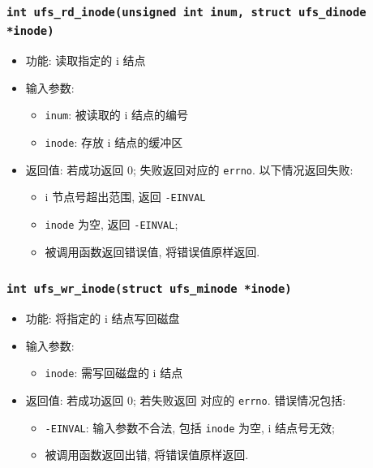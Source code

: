 \documentclass[nofonts]{ctexart}
\begin{document}
\subsubsection[\texttt{ufs\_free\_inode}]{\texttt{int ufs\_rd\_inode(unsigned int inum, struct ufs\_dinode *inode)}}
\begin{itemize}
\item
  功能: 读取指定的 i 结点
\item
  输入参数:

  \begin{itemize}
  \item
    \texttt{inum}: 被读取的 i 结点的编号
  \item
    \texttt{inode}: 存放 i 结点的缓冲区
  \end{itemize}
\item
  返回值: 若成功返回 0; 失败返回对应的 \texttt{errno}. 以下情况返回失败:

  \begin{itemize}
  \item
    i 节点号超出范围, 返回 \texttt{-EINVAL}
  \item
    \texttt{inode} 为空, 返回 \texttt{-EINVAL};
  \item
    被调用函数返回错误值, 将错误值原样返回.
  \end{itemize}
  \end{itemize}
  \subsubsection[\texttt{ufs\_wr\_inode}]{\texttt{int ufs\_wr\_inode(struct ufs\_minode *inode)}}
  \begin{itemize}
\item
  功能: 将指定的 i 结点写回磁盘
\item
  输入参数:

  \begin{itemize}
  \item
    \texttt{inode}: 需写回磁盘的 i 结点
  \end{itemize}
\item
  返回值: 若成功返回 0; 若失败返回 对应的 \texttt{errno}. 错误情况包括:

  \begin{itemize}
  \item
    \texttt{-EINVAL}: 输入参数不合法, 包括 \texttt{inode} 为空, i
    结点号无效;
  \item
    被调用函数返回出错, 将错误值原样返回.
  \end{itemize}
  \end{itemize}
\end{document}
